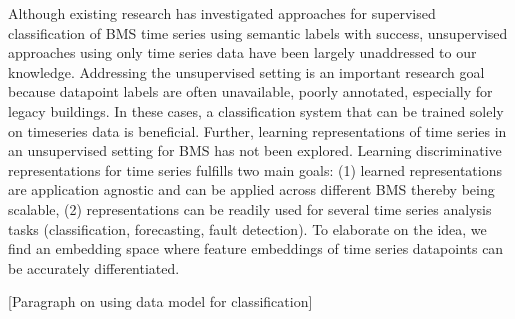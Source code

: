 Although existing research has investigated approaches for supervised classification of BMS time series using semantic labels with success, unsupervised approaches using only time series data have been largely unaddressed to our knowledge. Addressing the unsupervised setting is an important research goal because datapoint labels are often unavailable, poorly annotated, especially for legacy buildings. In these cases, a classification system that can be trained solely on timeseries data is beneficial. Further, learning representations of time series in an unsupervised setting for BMS has not been explored.
Learning discriminative representations for time series fulfills two main goals: (1) learned representations are application agnostic and can be applied across different BMS thereby being scalable, (2) representations can be readily used for several time series analysis tasks (classification, forecasting, fault detection).
To elaborate on the idea, we find an embedding space where feature embeddings of time series datapoints can be accurately differentiated.

[Paragraph on using data model for classification]